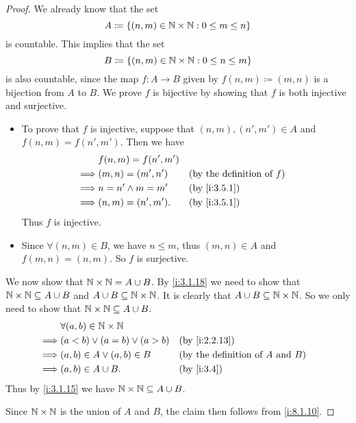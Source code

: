 \begin{proof}
  We already know that the set
  \[
    A \coloneqq \left\lbrace(n, m) \in \mathbb{N} \times \mathbb{N} : 0 \leq m \leq n\right\rbrace
  \]
  is countable.
  This implies that the set
  \[
    B \coloneqq \left\lbrace(n, m) \in \mathbb{N} \times \mathbb{N} : 0 \leq n \leq m\right\rbrace
  \]
  is also countable, since the map \(f : A \to B\) given by \(f(n, m) \coloneqq (m, n)\) is a bijection from \(A\) to \(B\).
  We prove \(f\) is bijective by showing that \(f\) is both injective and surjective.
  \begin{itemize}
    \item To prove that \(f\) is injective, suppose that \((n, m), (n', m') \in A\) and \(f(n, m) = f(n', m')\).
          Then we have
          \begin{align*}
                     & f(n, m) = f(n', m')                                          \\
            \implies & (m, n) = (m', n')   &  & \text{(by the definition of \(f\))} \\
            \implies & n = n' \land m = m' &  & \by{i:3.5.1}                        \\
            \implies & (n, m) = (n', m').  &  & \by{i:3.5.1}
          \end{align*}
          Thus \(f\) is injective.
    \item Since \(\forall (n, m) \in B\), we have \(n \leq m\), thus \((m, n) \in A\) and \(f(m, n) = (n, m)\).
          So \(f\) is surjective.
  \end{itemize}

  We now show that \(\mathbb{N} \times \mathbb{N} = A \cup B\).
  By \cref{i:3.1.18} we need to show that \(\mathbb{N} \times \mathbb{N} \subseteq A \cup B\) and \(A \cup B \subseteq \mathbb{N} \times \mathbb{N}\).
  It is clearly that \(A \cup B \subseteq \mathbb{N} \times \mathbb{N}\).
  So we only need to show that \(\mathbb{N} \times \mathbb{N} \subseteq A \cup B\).
  \begin{align*}
             & \forall (a, b) \in \N \times \N                                                      \\
    \implies & (a < b) \lor (a = b) \lor (a > b) &  & \by{i:2.2.13}                                 \\
    \implies & (a, b) \in A \lor (a, b) \in B    &  & \text{(by the definition of \(A\) and \(B\))} \\
    \implies & (a, b) \in A \cup B.              &  & \by{i:3.4}
  \end{align*}
  Thus by \cref{i:3.1.15} we have \(\mathbb{N} \times \mathbb{N} \subseteq A \cup B\).

  Since \(\mathbb{N} \times \mathbb{N}\) is the union of \(A\) and \(B\), the claim then follows from \cref{i:8.1.10}.
\end{proof}

